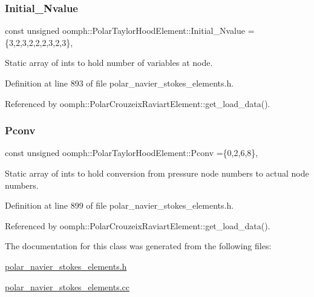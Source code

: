 \subsubsection{\texorpdfstring{Initial\+\_\+\+Nvalue}{Initial\_Nvalue}}
{\footnotesize\ttfamily const unsigned oomph\+::\+Polar\+Taylor\+Hood\+Element\+::\+Initial\+\_\+\+Nvalue =\{3,2,3,2,2,2,3,2,3\}\hspace{0.3cm}{\ttfamily [static]}, {\ttfamily [private]}}



Static array of ints to hold number of variables at node. 



Definition at line 893 of file polar\+\_\+navier\+\_\+stokes\+\_\+elements.\+h.



Referenced by oomph\+::\+Polar\+Crouzeix\+Raviart\+Element\+::get\+\_\+load\+\_\+data().

\mbox{\label{classoomph_1_1PolarTaylorHoodElement_a4804e4bdf732b17cdb7e55aebaebcab0}} 
\subsubsection{\texorpdfstring{Pconv}{Pconv}}
{\footnotesize\ttfamily const unsigned oomph\+::\+Polar\+Taylor\+Hood\+Element\+::\+Pconv =\{0,2,6,8\}\hspace{0.3cm}{\ttfamily [static]}, {\ttfamily [protected]}}



Static array of ints to hold conversion from pressure node numbers to actual node numbers. 



Definition at line 899 of file polar\+\_\+navier\+\_\+stokes\+\_\+elements.\+h.



Referenced by oomph\+::\+Polar\+Crouzeix\+Raviart\+Element\+::get\+\_\+load\+\_\+data().



The documentation for this class was generated from the following files\+:\begin{DoxyCompactItemize}
\item 
\hyperlink{polar__navier__stokes__elements_8h}{polar\+\_\+navier\+\_\+stokes\+\_\+elements.\+h}\item 
\hyperlink{polar__navier__stokes__elements_8cc}{polar\+\_\+navier\+\_\+stokes\+\_\+elements.\+cc}\end{DoxyCompactItemize}
